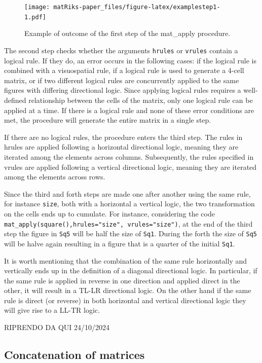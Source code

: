 \begin{figure}
\centering
\texttt{[image: matRiks-paper\_files/figure-latex/examplestep1-1.pdf]}
\caption{\label{fig:examplestep1}Example of outcome of the first step of the mat\_apply procedure.}
\end{figure}

The second step checks whether the arguments \texttt{hrules} or \texttt{vrules} contain a logical rule.
If they do, an error occurs in the following cases: if the logical rule is combined with a visuospatial rule, if a logical rule is used to generate a 4-cell matrix, or if two different logical rules are concurrently applied to the same figures with differing directional logic.
Since applying logical rules requires a well-defined relationship between the cells of the matrix, only one logical rule can be applied at a time.
If there is a logical rule and none of these error conditions are met, the procedure will generate the entire matrix in a single step.

If there are no logical rules, the procedure enters the third step.
The rules in hrules are applied following a horizontal directional logic, meaning they are iterated among the elements across columns.
Subsequently, the rules specified in vrules are applied following a vertical directional logic, meaning they are iterated among the elements across rows.

Since the third and forth steps are made one after another using the same rule, for instance \texttt{size}, both with a horizontal a vertical logic, the two transformation on the cells ends up to cumulate.
For instance, considering the code \texttt{mat\_apply(square(),hrules="size",\ vrules="size")}, at the end of the third step the figure in \texttt{Sq5} will be half the size of \texttt{Sq1}.
During the forth the size of \texttt{Sq5} will be halve again resulting in a figure that is a quarter of the initial \texttt{Sq1}.

It is worth mentioning that the combination of the same rule horizontally and vertically ends up in the definition of a diagonal directional logic.
In particular, if the same rule is applied in reverse in one direction and applied direct in the other, it will result in a TL-LR directional logic.
On the other hand if the same rule is direct (or reverse) in both horizontal and vertical directional logic they will give rise to a LL-TR logic.

RIPRENDO DA QUI 24/10/2024

\subsection{Concatenation of matrices}\label{concatenation-of-matrices}

